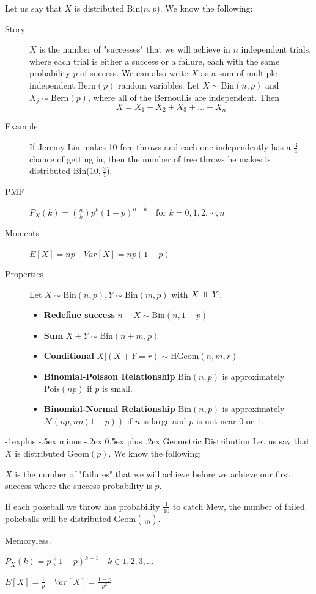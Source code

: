 \documentclass[10pt,landscape]{article}
\makeatletter
\newcommand\independent{\protect\mathpalette{\protect\independenT}{\perp}}
\def\independenT#1#2{\mathrel{\setbox0\hbox{$#1#2$}%
    \copy0\kern-\wd0\mkern4mu\box0}}
\newcommand{\N}{\mathcal{N}}
\newcommand{\Bern}{\textrm{Bern}}
\newcommand{\Bin}{\textrm{Bin}}
\newcommand{\Pois}{\textrm{Pois}}
\newcommand{\Geom}{\textrm{Geom}}
\newcommand{\HGeom}{\textrm{HGeom}}
\renewcommand{\subsection}{\@startsection{subsection}{2}{0mm}%
                                {-1explus -.5ex minus -.2ex}%
                                {0.5ex plus .2ex}%
                                {\normalfont\normalsize\bfseries}}
\makeatother
\begin{document}
\begin{multicols*}{3}
	Let us say that $X$ is distributed \Bin($n,p$). We know the following:
	\begin{description}
		\item[Story] $X$ is the number of "successes" that we will achieve in $n$ independent trials, where each trial is either a success or a failure, each with the same probability $p$ of success. We can also write $X$ as a sum of multiple independent $\Bern(p)$ random variables. Let $X \sim \Bin(n, p)$ and $X_j \sim \Bern(p)$, where all of the Bernoullis are independent. Then
		\[X = X_1 + X_2 + X_3 + \dots + X_n\]
		\item[Example] If Jeremy Lin makes 10 free throws and each one independently has a $\frac{3}{4}$ chance of getting in, then the number of free throws he makes is distributed  \Bin($10,\frac{3}{4}$).
		\item[PMF] $P_X(k) = {n  \choose k} p^k(1-p)^{n-k} \quad \text{for  } k=0,1,2,\cdots,n$
		\item[Moments] $E[X] = np \quad Var[X] = np(1-p)$
		\item[Properties] Let $X \sim \Bin(n,p), Y \sim \Bin(m,p)$ with $X \independent Y$.
		\begin{itemize}
			\item \textbf{Redefine success} $n-X \sim \Bin(n,1-p)$
			\item \textbf{Sum} $X+Y \sim \Bin(n+m,p)$
			\item \textbf{Conditional} $X|(X+Y=r) \sim \HGeom(n,m,r)$
			\item \textbf{Binomial-Poisson Relationship} $\Bin(n, p)$ is approximately  $\Pois(np)$ if $p$ is small.
			\item \textbf{Binomial-Normal Relationship} $\Bin(n, p)$ is approximately $\N(np,np(1-p))$ if $n$ is large and $p$ is not near $0$ or $1$.
		\end{itemize}
	\end{description}
									
	\subsection{Geometric Distribution} Let us say that $X$ is distributed $\Geom(p)$. We know the following:
	\begin{description}
		\item[Story] $X$ is the number of "failures" that we will achieve before we achieve our first success where the success probability is $p$.
		\item[Example] If each pokeball we throw has probability  $\frac{1}{10}$ to catch Mew, the number of failed pokeballs will be distributed $\Geom(\frac{1}{10})$.
		\item{Memoryless}.
        \item[PDF] $P_X(k)=p(1-p)^{k-1} \quad k \in {1,2,3, \dots}$
		\item[Moments] $E[X] = \frac{1}{p} \quad Var[X] = \frac{1-p}{p^2}$
	\end{description}
									

\end{multicols*}
\end{document}
